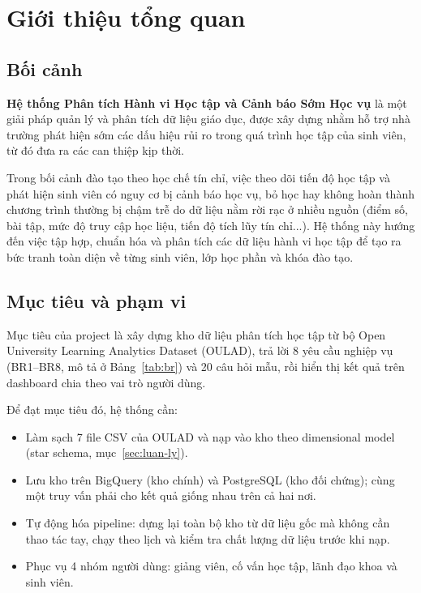 \section{Giới thiệu tổng quan}
\label{sec:mo-dau}

\subsection{Bối cảnh}
\textbf{Hệ thống Phân tích Hành vi Học tập và Cảnh báo Sớm Học vụ} là một giải pháp quản lý và phân tích dữ liệu giáo dục, được xây dựng nhằm hỗ trợ nhà trường phát hiện sớm các dấu hiệu rủi ro trong quá trình học tập của sinh viên, từ đó đưa ra các can thiệp kịp thời.

Trong bối cảnh đào tạo theo học chế tín chỉ, việc theo dõi tiến độ học tập và phát hiện sinh viên có nguy cơ bị cảnh báo học vụ, bỏ học hay không hoàn thành chương trình thường bị chậm trễ do dữ liệu nằm rời rạc ở nhiều nguồn (điểm số, bài tập, mức độ truy cập học liệu, tiến độ tích lũy tín chỉ...). Hệ thống này hướng đến việc tập hợp, chuẩn hóa và phân tích các dữ liệu hành vi học tập để tạo ra bức tranh toàn diện về từng sinh viên, lớp học phần và khóa đào tạo.

\subsection{Mục tiêu và phạm vi}
Mục tiêu của project là xây dựng kho dữ liệu phân tích học tập từ bộ Open University Learning Analytics Dataset (OULAD), trả lời 8 yêu cầu nghiệp vụ (BR1--BR8, mô tả ở Bảng~\ref{tab:br}) và 20 câu hỏi mẫu, rồi hiển thị kết quả trên dashboard chia theo vai trò người dùng.

Để đạt mục tiêu đó, hệ thống cần:
\begin{itemize}
  \item Làm sạch 7 file CSV của OULAD và nạp vào kho theo dimensional model (star schema, mục~\ref{sec:luan-ly}).
  \item Lưu kho trên BigQuery (kho chính) và PostgreSQL (kho đối chứng); cùng một truy vấn phải cho kết quả giống nhau trên cả hai nơi.
  \item Tự động hóa pipeline: dựng lại toàn bộ kho từ dữ liệu gốc mà không cần thao tác tay, chạy theo lịch và kiểm tra chất lượng dữ liệu trước khi nạp.
  \item Phục vụ 4 nhóm người dùng: giảng viên, cố vấn học tập, lãnh đạo khoa và sinh viên.
\end{itemize}


